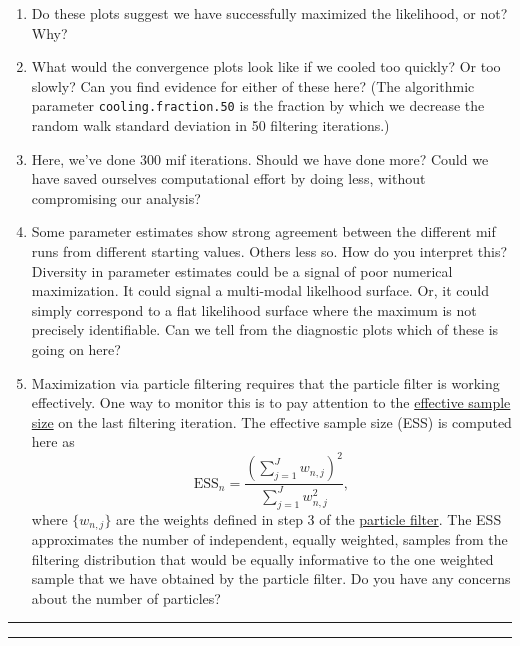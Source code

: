 \documentclass[]{article}
\begin{document}
\begin{enumerate}
\def\labelenumi{\arabic{enumi}.}
\item
  Do these plots suggest we have successfully maximized the likelihood,
  or not? Why?
\item
  What would the convergence plots look like if we cooled too quickly?
  Or too slowly? Can you find evidence for either of these here? (The
  algorithmic parameter \texttt{cooling.fraction.50} is the fraction by
  which we decrease the random walk standard deviation in 50 filtering
  iterations.)
\item
  Here, we've done 300 mif iterations. Should we have done more? Could
  we have saved ourselves computational effort by doing less, without
  compromising our analysis?
\item
  Some parameter estimates show strong agreement between the different
  mif runs from different starting values. Others less so. How do you
  interpret this? Diversity in parameter estimates could be a signal of
  poor numerical maximization. It could signal a multi-modal likelhood
  surface. Or, it could simply correspond to a flat likelihood surface
  where the maximum is not precisely identifiable. Can we tell from the
  diagnostic plots which of these is going on here?
\item
  Maximization via particle filtering requires that the particle filter
  is working effectively. One way to monitor this is to pay attention to
  the
  \href{https://en.wikipedia.org/wiki/Effective_sample_size}{effective
  sample size} on the last filtering iteration. The effective sample
  size (ESS) is computed here as
  \[ \mathrm{ESS}_{n}= \frac{\left(\sum_{j=1}^J w_{n,j}\right)^2}{\sum_{j=1}^J w_{n,j}^2},\]
  where \(\{w_{n,j}\}\) are the weights defined in step 3 of the
  \protect\hyperlink{the-particle-filter}{particle filter}. The ESS
  approximates the number of independent, equally weighted, samples from
  the filtering distribution that would be equally informative to the
  one weighted sample that we have obtained by the particle filter. Do
  you have any concerns about the number of particles? 
\end{enumerate}

\begin{center}\rule{0.5\linewidth}{\linethickness}\end{center}

\begin{center}\rule{0.5\linewidth}{\linethickness}\end{center}
\end{document}
